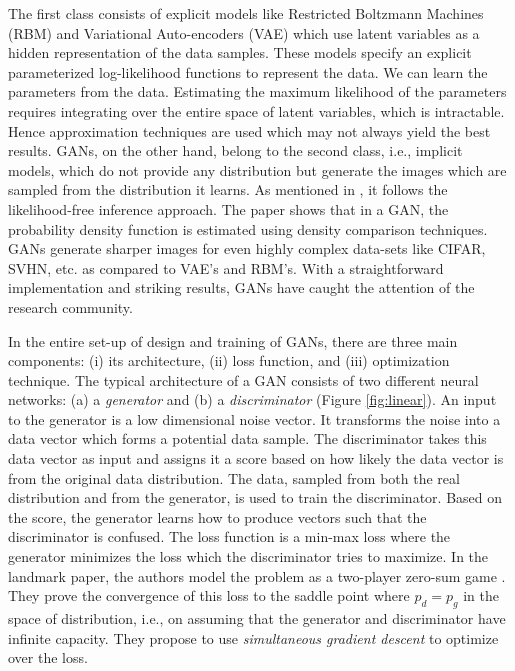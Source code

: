 The first class consists of explicit models like Restricted Boltzmann Machines (RBM) \citep{hinton2006} and Variational Auto-encoders (VAE) \citep{kingma2014} which use latent variables as a hidden representation of the data samples.  These models specify an explicit parameterized log-likelihood functions to represent the data. We can learn the parameters from the data. Estimating the maximum likelihood of the parameters requires integrating over the entire space of latent variables, which is intractable. Hence approximation techniques are used which may not always yield the best results. GANs, on the other hand, belong to the second class, i.e., implicit models, which do not provide any distribution but generate the images which are sampled from the distribution it learns. As mentioned in \citep{review}, it follows the likelihood-free inference approach. The paper shows that in a GAN, the probability density function is estimated using density comparison techniques. GANs generate sharper images for even highly complex data-sets like CIFAR, SVHN, etc. as compared to VAE's and RBM's. With a straightforward implementation and striking results, GANs have caught the attention of the  research community.

In the entire set-up of design and training of GANs, there are three main components: (i) its architecture, (ii) loss function, and (iii) optimization technique. The typical architecture of a GAN consists of two different neural networks: (a) a \emph{generator} and (b) a \emph{discriminator} (Figure \ref{fig:linear}).  An input to the generator is a low dimensional noise vector. It transforms the noise into a data vector which forms a potential data sample. The discriminator takes this data vector as input and assigns it a score based on how likely the data vector is from the original data distribution. The data, sampled from both the real distribution and from the generator, is used to train the discriminator. Based on the score, the generator learns how to produce vectors such that the discriminator is confused. The loss function is a min-max loss where the generator minimizes the loss which the discriminator tries to maximize. In the landmark paper, the authors model the problem as a two-player zero-sum game \citep{ganGoodfellow}. They prove the convergence of this loss to the saddle point where $p_d = p_g$ in the space of distribution, i.e., on assuming that the generator and discriminator have infinite capacity. They propose to use \emph{simultaneous gradient descent} to optimize over the loss.

